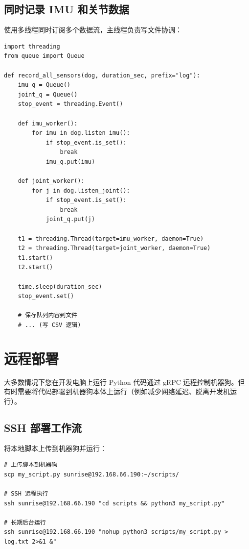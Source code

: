 \documentclass[a4paper,11pt,openany]{book}
\begin{document}
\subsection{同时记录 IMU 和关节数据}

使用多线程同时订阅多个数据流，主线程负责写文件协调：

\begin{lstlisting}[style=python]
import threading
from queue import Queue

def record_all_sensors(dog, duration_sec, prefix="log"):
    imu_q = Queue()
    joint_q = Queue()
    stop_event = threading.Event()

    def imu_worker():
        for imu in dog.listen_imu():
            if stop_event.is_set():
                break
            imu_q.put(imu)

    def joint_worker():
        for j in dog.listen_joint():
            if stop_event.is_set():
                break
            joint_q.put(j)

    t1 = threading.Thread(target=imu_worker, daemon=True)
    t2 = threading.Thread(target=joint_worker, daemon=True)
    t1.start()
    t2.start()

    time.sleep(duration_sec)
    stop_event.set()

    # 保存队列内容到文件
    # ... (写 CSV 逻辑)
\end{lstlisting}

\section{远程部署}

大多数情况下您在开发电脑上运行 Python 代码通过 gRPC 远程控制机器狗。但有时需要将代码部署到机器狗本体上运行（例如减少网络延迟、脱离开发机运行）。

\subsection{SSH 部署工作流}

将本地脚本上传到机器狗并运行：

\begin{lstlisting}[style=bash]
# 上传脚本到机器狗
scp my_script.py sunrise@192.168.66.190:~/scripts/

# SSH 远程执行
ssh sunrise@192.168.66.190 "cd scripts && python3 my_script.py"

# 长期后台运行
ssh sunrise@192.168.66.190 "nohup python3 scripts/my_script.py > log.txt 2>&1 &"
\end{lstlisting}
\end{document}

